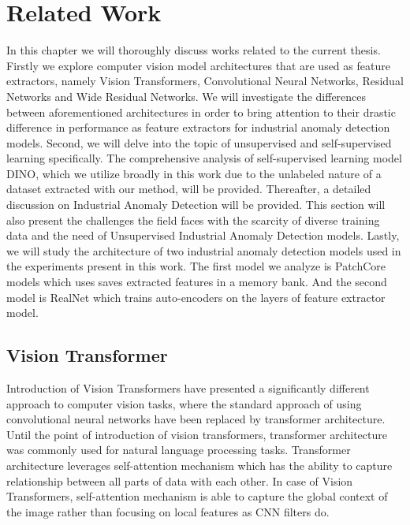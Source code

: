 \chapter{Related Work}
\label{chapter:ch2}
In this chapter we will thoroughly discuss works related to the current thesis. Firstly we explore computer vision model architectures that are used as feature extractors, namely Vision Transformers, Convolutional Neural Networks, Residual Networks and Wide Residual Networks. We will investigate the differences between aforementioned architectures in order to bring attention to their drastic difference in performance as feature extractors for industrial anomaly detection models. Second, we will delve into the topic of unsupervised and self-supervised learning specifically. The comprehensive analysis of self-supervised learning model DINO, which we utilize broadly in this work due to the unlabeled nature of a dataset extracted with our method, will be provided. Thereafter, a detailed discussion on Industrial Anomaly Detection will be provided. This section will also present the challenges the field faces with the scarcity of diverse training data and the need of Unsupervised Industrial Anomaly Detection models. Lastly, we will study the architecture of two industrial anomaly detection models used in the experiments present in this work. The first model we analyze is PatchCore models which uses saves extracted features in a memory bank. And the second model is RealNet which trains auto-encoders on the layers of feature extractor model.

\section{Vision Transformer}
\label{vit}
Introduction of Vision Transformers have presented a significantly different approach to computer vision tasks, where the standard approach of using convolutional neural networks have been replaced by transformer architecture. Until the point of introduction of vision transformers, transformer architecture was commonly used for natural language processing tasks. Transformer architecture leverages self-attention mechanism which has the ability to capture relationship between all parts of data with each other. In case of Vision Transformers, self-attention mechanism is able to capture the global context of the image rather than focusing on local features as CNN filters do.

